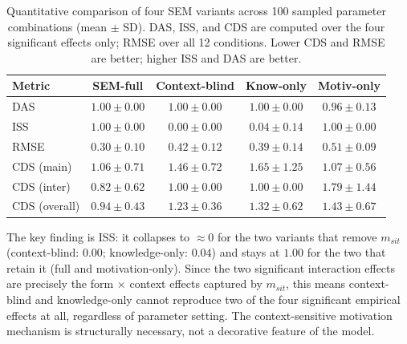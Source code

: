 \documentclass[12pt,a4paper]{article}
\begin{document}
\begin{table}[ht]
\centering
\caption{Quantitative comparison of four SEM variants across 100 sampled
         parameter combinations (mean $\pm$ SD). DAS, ISS, and CDS are
         computed over the four significant effects only; RMSE over all 12
         conditions. Lower CDS and RMSE are better; higher ISS and DAS are
         better.}
\label{tab:variant_comparison}
\renewcommand{\arraystretch}{1.15}
\begin{tabular}{lcccc}
\toprule
Metric & SEM-full & Context-blind & Know-only & Motiv-only \\
\midrule
DAS            & $1.00 \pm 0.00$ & $1.00 \pm 0.00$ & $1.00 \pm 0.00$ & $0.96 \pm 0.13$ \\
ISS            & $\mathbf{1.00 \pm 0.00}$ & $0.00 \pm 0.00$ & $0.04 \pm 0.14$ & $1.00 \pm 0.00$ \\
RMSE           & $\mathbf{0.30 \pm 0.10}$ & $0.42 \pm 0.12$ & $0.39 \pm 0.14$ & $0.51 \pm 0.09$ \\
CDS (main)     & $\mathbf{1.06 \pm 0.71}$ & $1.46 \pm 0.72$ & $1.65 \pm 1.25$ & $1.07 \pm 0.56$ \\
CDS (inter)    & $\mathbf{0.82 \pm 0.62}$ & $1.00 \pm 0.00$ & $1.00 \pm 0.00$ & $1.79 \pm 1.44$ \\
CDS (overall)  & $\mathbf{0.94 \pm 0.43}$ & $1.23 \pm 0.36$ & $1.32 \pm 0.62$ & $1.43 \pm 0.67$ \\
\bottomrule
\end{tabular}
\end{table}

The key finding is ISS: it collapses to $\approx 0$ for the two variants that
remove $m_{sit}$ (context-blind: $0.00$; knowledge-only: $0.04$) and stays at
$1.00$ for the two that retain it (full and motivation-only). Since the two
significant interaction effects are precisely the form $\times$ context effects
captured by $m_{sit}$, this means context-blind and knowledge-only cannot
reproduce two of the four significant empirical effects at all, regardless of
parameter setting. The context-sensitive motivation mechanism is structurally
necessary, not a decorative feature of the model.
\end{document}
